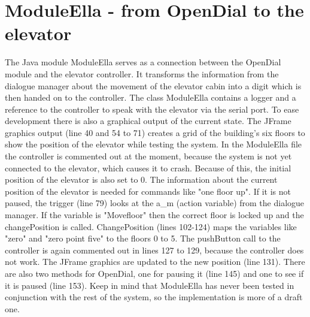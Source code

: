 \documentclass[a4paper, 12pt]{article}
\begin{document}
\newpage
\section{ModuleElla - from OpenDial to the elevator}
The Java module ModuleElla serves as a connection between the OpenDial module and the elevator controller.
It transforms the information from the dialogue manager about the movement of the elevator cabin into a digit which is then handed on to the controller.
The class ModuleElla contains a logger and a reference to the controller to speak with the elevator via the serial port.
To ease development there is also a graphical output of the current state.
The JFrame graphics output (line 40 and 54 to 71) creates a grid of the building's six floors to show the position of the elevator while testing the system.
In the ModuleElla file the controller is commented out at the moment, because the system is not yet connected to the elevator, which causes it to crash.
Because of this, the initial position of the elevator is also set to 0.
The information about the current position of the elevator is needed for commands like "one floor up".
If it is not paused, the trigger (line 79) looks at the a\_m (action variable) from the dialogue manager.
If the variable is "Movefloor" then the correct floor is locked up and the changePosition is called.
ChangePosition (lines 102-124) maps the variables like "zero" and "zero point five" to the floors 0 to 5.
The pushButton call to the controller is again commented out in lines 127 to 129, because the controller does not work.
The JFrame graphics are updated to the new position (line 131).
There are also two methods for OpenDial, one for pausing it (line 145) and one to see if it is paused (line 153).
Keep in mind that ModuleElla has never been tested in conjunction with the rest of the system, so the implementation is more of a draft one.


\newpage
\end{document}
